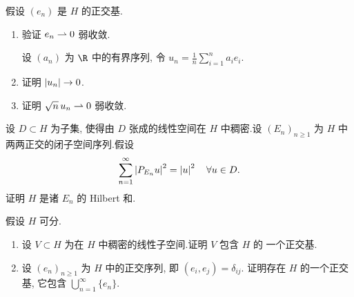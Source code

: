 \begin{exercise}
\label{exer:5.26}
假设 $(e_n)$ 是 $H$ 的正交基.
\begin{enumerate}[label=\arabic*., leftmargin=2.2em, itemsep=0.3em]
	\item 验证 $e_n\rightharpoonup0$ 弱收敛.

	      设 $(a_n)$ 为 $\R$ 中的有界序列, 令
	      $u_n=\frac1n\sum_{i=1}^na_ie_i$.
	\item 证明 $\left|u_n\right|\to0$.
	\item 证明 $\sqrt{n}\,u_n\rightharpoonup0$ 弱收敛.
\end{enumerate}
\end{exercise}

\begin{exercise}
\label{exer:5.27}
设 $D\subset H$ 为子集, 使得由 $D$ 张成的线性空间在 $H$ 中稠密.设
$(E_n)_{n\ge1}$ 为 $H$ 中两两正交的闭子空间序列.假设
\begin{equation*}
\sum_{n=1}^\infty\left|P_{E_n}u\right|^2=\left|u\right|^2\quad\forall u\in D.
\end{equation*}
证明 $H$ 是诸 $E_n$ 的 Hilbert 和.
\end{exercise}

\begin{exercise}
\label{exer:5.28}
假设 $H$ 可分.
\begin{enumerate}[label=\arabic*., leftmargin=2.2em, itemsep=0.3em]
	\item 设 $V\subset H$ 为在 $H$ 中稠密的线性子空间.证明 $V$ 包含 $H$ 的
	      一个正交基.
	\item 设 $(e_n)_{n\ge1}$ 为 $H$ 中的正交序列, 即 $(e_i,e_j)=\delta_{ij}$.
	      证明存在 $H$ 的一个正交基, 它包含 $\bigcup_{n=1}^\infty\{e_n\}$.
\end{enumerate}
\end{exercise}

